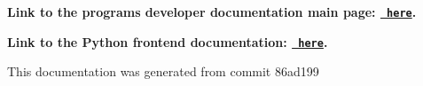 \label{index_md_repo_FORTRAN_MAINPAGE}%
%
 {\bfseries{Link to the program\textquotesingle{}s developer documentation main page\+: \href{https://joegilkes.github.io/PX915-Docs/}{\texttt{ here}}.}}

{\bfseries{Link to the Python frontend documentation\+: \href{https://joegilkes.github.io/PX915-Docs/python/docs/index.html}{\texttt{ here}}.}}

This documentation was generated from commit 86ad199 